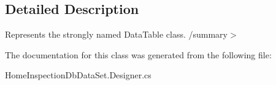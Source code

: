 \subsection{Detailed Description}
Represents the strongly named Data\+Table class. /summary$>$ 

The documentation for this class was generated from the following file\+:\begin{DoxyCompactItemize}
\item 
Home\+Inspection\+Db\+Data\+Set.\+Designer.\+cs\end{DoxyCompactItemize}
